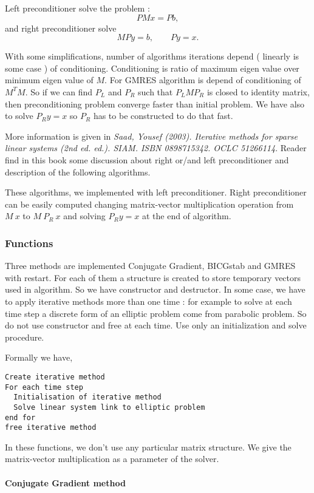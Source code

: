 Left preconditioner solve the problem :
$$ P M x = P b, $$
and right preconditioner solve
$$ M P y  = b, \quad \quad P y = x.$$

With some simplifications, number of algorithms iterations depend ( linearly is
some case ) of conditioning. Conditioning is ratio of maximum eigen value over minimum
eigen value of $M$. For GMRES algorithm is depend of conditioning of $M^{T}
M$. So if we can find $P_L$ and $P_R$ such that $P_L M P_R$ is closed to
identity matrix, then preconditioning problem converge faster than initial
problem. We have also to solve $P_R y = x$ so $P_R$ has to be constructed to
do that fast.

More information is given in {\em Saad, Yousef (2003). Iterative methods for
  sparse linear systems (2nd ed. ed.). SIAM. ISBN 0898715342. OCLC 51266114}.
Reader find in this book some discussion about right or/and left
preconditioner and description of the following algorithms. 

These algorithms, we implemented with left preconditioner. Right preconditioner can be easily computed changing matrix-vector
multiplication operation from $M \ x $ to $ M \ P_R \ x$ and solving
$P_R y = x$ at the end of algorithm.


\subsubsection{Functions}
Three methods are implemented Conjugate Gradient, BICGstab and GMRES with restart. For each
of them a structure is created to store temporary vectors used in algorithm. So
we have constructor and destructor. In some case, we have to apply iterative
methods more than one time : for example to solve at each time step a discrete form of an elliptic
problem come from parabolic problem. So do not use constructor and free at
each time. Use only an initialization and solve procedure.  

Formally we have, 
\begin{verbatim}
Create iterative method
For each time step
  Initialisation of iterative method
  Solve linear system link to elliptic problem
end for
free iterative method
\end{verbatim}

In these functions, we don't use any particular matrix structure. We give the
matrix-vector multiplication as a parameter of the solver. 

\paragraph{Conjugate Gradient method}

